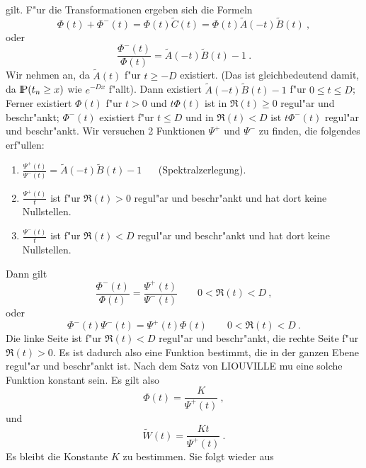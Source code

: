 gilt. F"ur die Transformationen ergeben sich die Formeln
\begin{displaymath}
\Phi (t) + \Phi^{-}(t) = \Phi (t) \tilde C (t) = \Phi (t) \tilde A (-t)
\tilde B (t) ~,  
\end{displaymath}
oder
\begin{displaymath}
\frac{\Phi^{-}(t)}{\Phi (t)} = \tilde A (-t)  \tilde B (t) -1 ~.
\end{displaymath}
Wir nehmen an, da\3 $\tilde A(t)$ f"ur $t \geq -D$ existiert. (Das ist
gleichbedeutend damit, da\3 ${\rm I\kern-0.2em P} (t_{n} \geq x)$ wie $e^{-Dx}$ f"allt).
Dann existiert $\tilde A (-t) \tilde B (t) - 1$ f"ur $0 \leq t \leq D$;
Ferner existiert $\Phi (t)$ f"ur $t >0$ und $t \Phi (t)$ ist in $\Re (t)
\geq 0$ regul"ar und beschr"ankt; $\Phi^{-}(t)$ existiert f"ur $t \leq D$
und in $\Re (t) < D$ ist $t\Phi^{-}(t)$ regul"ar und beschr"ankt. Wir
versuchen 2 Funktionen $\Psi^{+}$ und $\Psi^{-}$ zu finden, die folgendes
erf"ullen:
\begin{enumerate}
\item $\frac{\Psi^{+}(t)}{\Psi^{-}(t)} = \tilde A(-t) \tilde B(t) -1$ ~ ~(Spektralzerlegung).
\item $\frac{\Psi^{+}(t)}{t}$ ist f"ur $\Re(t)>0$ regul"ar und beschr"ankt
und hat dort keine Nullstellen.
\item $\frac{\Psi^{-}(t)}{t}$ ist f"ur $\Re (t) < D$ regul"ar und
beschr"ankt und hat dort keine Nullstellen.
\end{enumerate}
Dann gilt
\begin{displaymath}
\frac{\Phi^{-}(t)}{\Phi (t)} = \frac{\Psi^{+}(t)}{\Psi^{-}(t)} \qquad
0< \Re (t) < D ~,
\end{displaymath}
oder
\begin{displaymath}
\Phi^{-}(t) \Psi^{-}(t) = \Psi^{+}(t) \Phi (t) \qquad 0< \Re (t) < D ~.
\end{displaymath}
Die linke Seite ist f"ur $\Re (t) < D$ regul"ar und beschr"ankt, die
rechte Seite f"ur $\Re (t) > 0$. Es ist dadurch also eine Funktion
bestimmt, die in der ganzen Ebene regul"ar und beschr"ankt ist. Nach dem
Satz von LIOUVILLE mu\3 eine solche Funktion konstant sein. Es gilt also
\begin{displaymath}
\Phi (t) = \frac{K}{\Psi^{+}(t)} ~,
\end{displaymath}
und
\begin{displaymath}
\tilde W (t) =  \frac{Kt}{\Psi^{+}(t)} ~.
\end{displaymath}
Es bleibt die Konstante $K$ zu bestimmen. Sie folgt wieder aus
